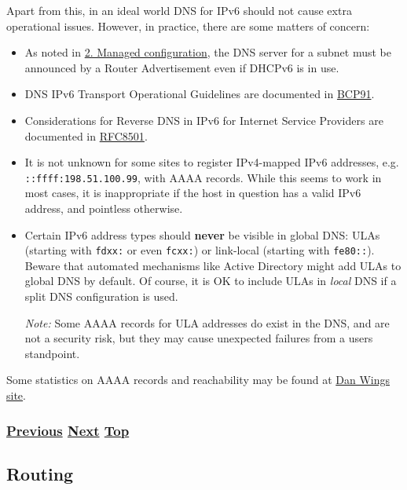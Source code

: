 \documentclass[
]{article}
\begin{document}
Apart from this, in an ideal world DNS for IPv6 should not cause extra
operational issues. However, in practice, there are some matters of
concern:

\begin{itemize}
\item
  As noted in \hyperref[managed-configuration]{2. Managed
  configuration}, the DNS server for a subnet must be announced by a
  Router Advertisement even if DHCPv6 is in use.
\item
  DNS IPv6 Transport Operational Guidelines are documented in
  \href{https://www.rfc-editor.org/info/bcp91}{BCP91}.
\item
  Considerations for Reverse DNS in IPv6 for Internet Service Providers
  are documented in
  \href{https://www.rfc-editor.org/info/rfc8501}{RFC8501}.
\item
  It is not unknown for some sites to register IPv4-mapped IPv6
  addresses, e.g. \texttt{::ffff:198.51.100.99}, with AAAA records.
  While this seems to work in most cases, it is inappropriate if the
  host in question has a valid IPv6 address, and pointless otherwise.
\item
  Certain IPv6 address types should \textbf{never} be visible in global
  DNS: ULAs (starting with \texttt{fdxx:} or even \texttt{fcxx:}) or
  link-local (starting with \texttt{fe80::}). Beware that automated
  mechanisms like Active Directory might add ULAs to global DNS by
  default. Of course, it is OK to include ULAs in \emph{local} DNS if a
  split DNS configuration is used.

  \emph{Note:} Some AAAA records for ULA addresses do exist in the DNS,
  and are not a security risk, but they may cause unexpected failures
  from a user\textquotesingle s standpoint.
\end{itemize}

Some statistics on AAAA records and reachability may be found at
\href{https://www.employees.org/~dwing/aaaa-stats/}{Dan
Wing\textquotesingle s site}.

\subsubsection{\texorpdfstring{\hyperref[managed-configuration]{Previous}
\hyperref[routing]{Next}
\hyperref[ipv6-basic-technology]{Top}}{Previous Next Top}}\label{previous-next-top-12}

\pagebreak

\subsection{Routing}\label{routing}
\end{document}
